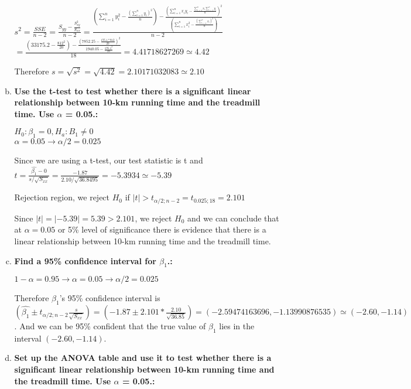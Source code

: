 \documentclass{article}
\begin{document}
\begin{enumerate}[1.]
\begin{enumerate}[(a)]
\begingroup
\Large
$s^2 = \frac{SSE}{n-2} = \frac{S_{yy} - \frac{S_{xy}^2}{S_{xx}}}{n-2} = \frac{            (\sum_{i=1}^{n}{y_i^2} - \frac{ (\sum_{i=1}^{n}{y_i})^2}{n} )  - 
\frac{   ( \sum_{i=1}^{n}{x_iy_i }  - \frac{  \sum_{i=1}^{n}{x_i}  \sum_{i=1}^{n}{y_i}  }{n})^2     }
{    (\sum_{i=1}^{n}{x_i^2} - \frac{ (\sum_{i=1}^{n}{x_i})^2}{n} )     }}
{n - 2}$ \\
$ = \frac{ (33175.2 - \frac{812^2}{20}) - \frac{ (7852.25 - \frac{195.1 * 812}{20})^2}{1940.05-\frac{195.1^2}{20}}  }{18} = 4.41718627269 \simeq 4.42 $
\endgroup

Therefore $s = \sqrt{s^2} = \sqrt{4.42} = 2.10171032083 \simeq 2.10$

  \item \textbf{Use the t-test to test whether there is a significant linear relationship between 10-km
running time and the treadmill time. Use $\alpha$ = 0.05.: }

$H_0: \beta_1 = 0, H_a: B_1 \neq 0$ \\
$\alpha = 0.05 \to \alpha/2 = 0.025$

Since we are using a t-test, our test statistic is t and $t= \frac{\hat{\beta_1} - 0}{s/\sqrt{S_{xx}}} = \frac{-1.87}{2.10/\sqrt{36.8495}} = -5.3934 \simeq -5.39$

Rejection region, we reject $H_0$ if $|t| > t_{\alpha/2;n-2} = t_{0.025;18} = 2.101$

Since $|t| = |-5.39| = 5.39 > 2.101$, we reject $H_0$ and we can conclude that at $\alpha = 0.05$ or 5\% level of significance there is evidence that there is a linear relationship between 10-km running time and the treadmill time.

  \item \textbf{ Find a 95\% confidence interval for $\beta_1$.: }

$1 - \alpha = 0.95 \to \alpha = 0.05 \to \alpha/2 = 0.025$

Therefore $\beta_1$'s 95\% confidence interval is \\ 
$(\hat{\beta_1} \pm t_{\alpha/2;n-2}\frac{s}{\sqrt{S_{xx}}}) = (-1.87 \pm 2.101 * \frac{2.10}{\sqrt{36.85}}) = (-2.59474163696, -1.13990876535) \simeq (-2.60, -1.14) $. And we can be 95\% confident that the true value of $\beta_1$ lies in the interval $(-2.60, -1.14)$.

  \item \textbf{ Set up the ANOVA table and use it to test whether there is a significant linear relationship between 10-km running time and the treadmill time. Use $\alpha$ = 0.05.: }


\end{enumerate}
\end{enumerate}
\end{document}

